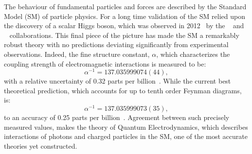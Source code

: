 The behaviour of fundamental particles and forces are described by the Standard Model (SM) of
particle physics.
For a long time validation of the SM relied upon the discovery of a scalar Higgs boson, which was
observed in 2012~\cite{Chatrchyan:2012ufa,Aad:2012tfa} by the
\cms~\cite{Chatrchyan:2012ufa} and \atlas~\cite{Aad:2012tfa} collaborations.
This final piece of the picture has made the SM a remarkably robust theory with no predictions
deviating significantly from experimental observations.
Indeed, the fine structure constant, $\alpha$, which characterizes the coupling strength of
electromagnetic interactions
is measured to be:
\begin{equation}
  \alpha^{-1} = 137.035 999 074 (44),
\end{equation}
with a relative uncertainty of 0.32 parts per billion~\cite{PDG2012}.
While the current best theoretical prediction, which accounts for up to tenth order Feynman
diagrams, is:
\begin{equation}
  \alpha^{-1} = 137.035 999 073 (35),
\end{equation}
to an accuracy of 0.25 parts per billion~\cite{Aoyama:2012wj}.
Agreement between such precisely measured values, makes the theory of Quantum Electrodynamics, which
describes interactions of photons and charged particles in the SM, one of the most accurate
theories yet constructed.


